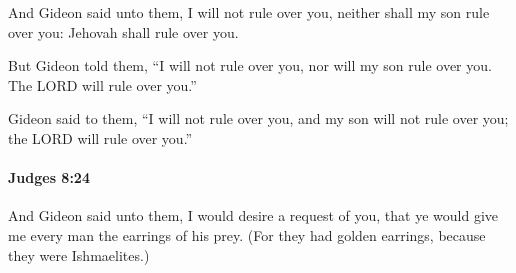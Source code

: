 			\begin{versebox}
					\item[BHS] 
					\item[ASV] And Gideon said unto them, I will not rule over you, neither shall my son rule over you: Jehovah shall rule over you.
					\item[NIV] But Gideon told them, “I will not rule over you, nor will my son rule over you. The LORD will rule over you.”
					\item[NRSV] Gideon said to them, “I will not rule over you, and my son will not rule over you; the LORD will rule over you.”
			\end{versebox}

		\paragraph{Judges 8:24} %
			\label{JUDGES-8-24}

			And Gideon said unto them, I would desire a request of you, that ye would give me every man the earrings of his prey. (For they had golden earrings, because they were Ishmaelites.)

